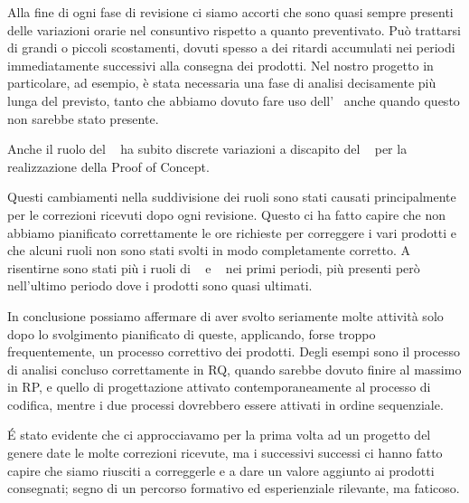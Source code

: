    Alla fine di ogni fase di revisione ci siamo accorti che sono quasi sempre presenti delle variazioni orarie nel consuntivo rispetto a quanto preventivato.
    Può trattarsi di grandi o piccoli scostamenti, dovuti spesso a dei ritardi accumulati nei periodi immediatamente successivi alla consegna dei prodotti.
    Nel nostro progetto in particolare, ad esempio, è stata necessaria una fase di analisi decisamente più lunga del previsto, tanto che abbiamo dovuto fare uso dell'\Ana~ anche quando questo non sarebbe stato presente. \par
    Anche il ruolo del \Prog~ ha subito discrete variazioni a discapito del \Progr~ per la realizzazione della Proof of Concept. \par
    Questi cambiamenti nella suddivisione dei ruoli sono stati causati principalmente per le correzioni ricevuti dopo ogni revisione. Questo ci ha fatto capire che non abbiamo pianificato correttamente le ore richieste per correggere i vari prodotti e che alcuni ruoli non sono stati svolti in modo completamente corretto. A risentirne sono stati più i ruoli di \Res~ e \Ver~ nei primi periodi, più presenti però nell'ultimo periodo dove i prodotti sono quasi ultimati. \par
    In conclusione possiamo affermare di aver svolto seriamente molte attività solo dopo lo svolgimento pianificato di queste, applicando, forse troppo frequentemente, un processo correttivo dei prodotti. Degli esempi sono il processo di analisi concluso correttamente in RQ, quando sarebbe dovuto finire al massimo in RP, e quello di progettazione attivato contemporaneamente al processo di codifica, mentre i due processi dovrebbero essere attivati in ordine sequenziale. \par
    \'E stato evidente che ci approcciavamo per la prima volta ad un progetto del genere date le molte correzioni ricevute, ma i successivi successi ci hanno fatto capire che siamo riusciti a correggerle e a dare un valore aggiunto ai prodotti consegnati; segno di un percorso formativo ed esperienziale rilevante, ma faticoso.